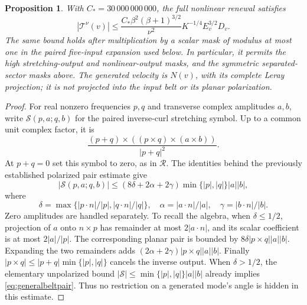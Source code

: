 \documentclass[11pt]{article}
\newtheorem{proposition}{Proposition}
\begin{document}
\begin{proposition}\label{prop:beltcaloric}
With $C_*=30\,000\,000\,000$, the full nonlinear renewal satisfies
\begin{equation}\label{eq:beltcaloric}
 |\mathcal T^\nu(v)|
 \leq\frac{C_*\beta^2(\beta+1)^{3/2}}{\nu^2}
                  K^{-1/4}E_v^{3/2}D_v.
\end{equation}
The same bound holds after multiplication by a scalar mask of modulus
at most one in the paired five-input expansion used below. In particular,
it permits the high stretching-output and nonlinear-output masks, and
the symmetric separated-sector masks above. The generated velocity is
$N(v)$, with its complete Leray projection; it is not projected into
the input belt or its planar polarization.
\end{proposition}
\begin{proof}
For real nonzero frequencies $p,q$ and transverse complex amplitudes
$a,b$, write $\mathcal S(p,a;q,b)$ for the paired inverse-curl stretching
symbol. Up to a common unit complex factor, it is
\[
 \frac{(p+q)\times((p\times q)\times(a\times b))}{|p+q|^2}.
\]
At $p+q=0$ set this symbol to zero, as in $\mathcal R$.
The identities behind the previously established polarized pair estimate
give
\begin{equation}\label{eq:generalbeltpair}
 |\mathcal S(p,a;q,b)|\leq
  (8\delta+2\alpha+2\gamma)\min\{|p|,|q|\}|a||b|,
\end{equation}
where
\[
 \delta=\max\{|p\cdot n|/|p|,|q\cdot n|/|q|\},\quad
 \alpha=|a\cdot n|/|a|,\quad\gamma=|b\cdot n|/|b|.
\]
Zero amplitudes are handled separately. To recall the algebra, when
$\delta\leq1/2$, projection of $a$ onto $n\times p$ has remainder
at most $2|a\cdot n|$, and its scalar coefficient is at most
$2|a|/|p|$. The corresponding planar pair is bounded by
$8\delta|p\times q||a||b|$. Expanding the two remainders adds
$(2\alpha+2\gamma)|p\times q||a||b|$. Finally
$|p\times q|\leq|p+q|\min\{|p|,|q|\}$ cancels the inverse output.
When $\delta>1/2$, the elementary unpolarized bound
$|\mathcal S|\leq\min\{|p|,|q|\}|a||b|$ already implies
\eqref{eq:generalbeltpair}. Thus no restriction on a generated mode's
angle is hidden in this estimate.


\end{proof}
\end{document}
